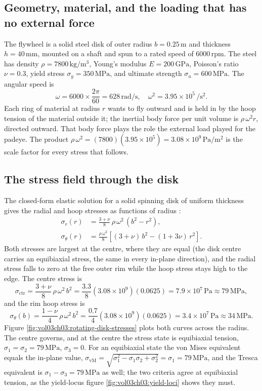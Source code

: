 \subsection{Geometry, material, and the loading that has no external force}

The flywheel is a solid steel disk of outer radius $b = 0.25\,\si{
\meter}$ and thickness $h = 40\,\si{\milli\meter}$, mounted on a shaft
and spun to a rated speed of $6000\,\text{rpm}$. The steel has density
$\rho = 7800\,\si{\kilogram\per\meter\cubed}$, Young's modulus $E =
200\,\text{GPa}$, Poisson's ratio $\nu = 0.3$, yield stress $\sigma_y =
350\,\text{MPa}$, and ultimate strength $\sigma_u = 600\,\text{MPa}$.
The angular speed is
\[
\omega = 6000 \times \frac{2\pi}{60} = 628\,\si{\radian\per\second},
\quad \omega^2 = 3.95\times 10^{5}\,\si{\per\second\squared}.
\]
Each ring of material at radius $r$ wants to fly outward and is held in
by the hoop tension of the material outside it; the inertial body force
per unit volume is $\rho\,\omega^2 r$, directed outward. That body force
plays the role the external load played for the padeye. The product
$\rho\,\omega^2 = (7800)(3.95\times 10^5) = 3.08\times 10^9\,\si{\pascal
\per\meter\squared}$ is the scale factor for every stress that follows.

\subsection{The stress field through the disk}

The closed-form elastic solution for a solid spinning disk of uniform
thickness gives the radial and hoop stresses as functions of radius
\cite[ch.~3]{text:shigley2020}:
\begin{align*}
\sigma_r(r) &= \frac{3+\nu}{8}\,\rho\,\omega^2\,(b^2 - r^2), \\
\sigma_\theta(r) &= \frac{\rho\,\omega^2}{8}\left[(3+\nu)\,b^2 -
(1+3\nu)\,r^2\right].
\end{align*}
Both stresses are largest at the centre, where they are equal (the disk
centre carries an equibiaxial stress, the same in every in-plane
direction), and the radial stress falls to zero at the free outer rim
while the hoop stress stays high to the edge. The centre stress is
\[
\sigma_{\text{ctr}} = \frac{3+\nu}{8}\,\rho\,\omega^2\,b^2 =
\frac{3.3}{8}(3.08\times 10^9)(0.0625) = 7.9\times 10^7\,\text{Pa}
\approx 79\,\text{MPa},
\]
and the rim hoop stress is
\[
\sigma_\theta(b) = \frac{1-\nu}{4}\,\rho\,\omega^2\,b^2 =
\frac{0.7}{4}(3.08\times 10^9)(0.0625) = 3.4\times 10^7\,\text{Pa}
\approx 34\,\text{MPa}.
\]
Figure \ref{fig:vol03ch03:rotating-disk-stresses} plots both curves
across the radius. The centre governs, and at the centre the stress
state is equibiaxial tension, $\sigma_1 = \sigma_2 = 79\,\text{MPa}$,
$\sigma_3 = 0$. For an equibiaxial state the von Mises equivalent equals
the in-plane value, $\sigma_{\text{vM}} = \sqrt{\sigma_1^2 -
\sigma_1\sigma_2 + \sigma_2^2} = \sigma_1 = 79\,\text{MPa}$, and the
Tresca equivalent is $\sigma_1 - \sigma_3 = 79\,\text{MPa}$ as well; the
two criteria agree at equibiaxial tension, as the yield-locus figure
\ref{fig:vol03ch03:yield-loci} shows they must.

